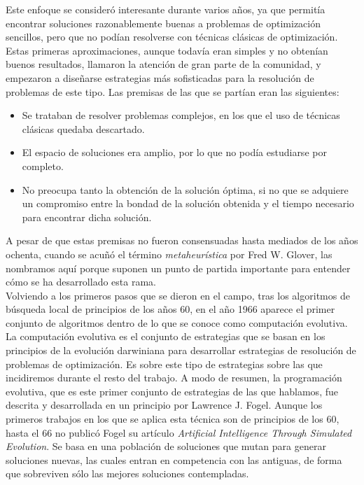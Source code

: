\documentclass[12pt]{article} \usepackage[utf8x]{inputenc}
\begin{document}
Este enfoque se consideró interesante durante varios años, ya que
permitía encontrar soluciones razonablemente buenas a problemas de
optimización sencillos, pero que no podían resolverse con técnicas
clásicas de optimización.\\

Estas primeras aproximaciones, aunque todavía eran simples y no
obtenían buenos resultados, llamaron la atención de gran parte de la
comunidad, y empezaron a diseñarse estrategias más sofisticadas para
la resolución de problemas de este tipo. Las premisas de las que se
partían eran las siguientes:

\begin{itemize}
\item Se trataban de resolver problemas complejos, en los que el uso
  de técnicas clásicas quedaba descartado.
\item El espacio de soluciones era amplio, por lo que no podía
  estudiarse por completo.
\item No preocupa tanto la obtención de la solución óptima, si no que
  se adquiere un compromiso entre la bondad de la solución obtenida y
  el tiempo necesario para encontrar dicha solución.
\end{itemize}

A pesar de que estas premisas no fueron consensuadas hasta mediados de
los años ochenta, cuando se acuñó el término \textit{metaheurística}
por Fred W. Glover, las nombramos aquí porque suponen un punto de
partida importante para entender cómo se ha desarrollado esta rama.\\

Volviendo a los primeros pasos que se dieron en el campo, tras los
algoritmos de búsqueda local de principios de los años 60, en el año
1966 aparece el primer conjunto de algoritmos dentro de lo que se
conoce como computación evolutiva. La computación evolutiva es el
conjunto de estrategias que se basan en los principios de la evolución
darwiniana para desarrollar estrategias de resolución de problemas de
optimización. Es sobre este tipo de estrategias sobre las que
incidiremos durante el resto del trabajo. A modo de resumen, la
programación evolutiva, que es este primer conjunto de estrategias de
las que hablamos, fue descrita y desarrollada en un principio por
Lawrence J. Fogel. Aunque los primeros trabajos en los que se aplica
esta técnica son de principios de los 60, hasta el 66 no publicó Fogel
su artículo \textit{Artificial Intelligence Through Simulated
  Evolution}.  Se basa en una población de soluciones que mutan para
generar soluciones nuevas, las cuales entran en competencia con las
antiguas, de forma que sobreviven sólo las mejores soluciones
contempladas.\\
\end{document}
